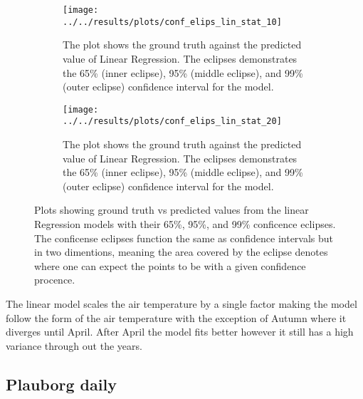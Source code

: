 
\begin{figure}
	\begin{subfigure}{0.45\linewidth}
		\centering
		\texttt{[image: ../../results/plots/conf\_elips\_lin\_stat\_10]}
		\caption[Confidence eclipse of Linear Regression 10cm]{The plot shows the ground truth against the predicted value of Linear Regression. The eclipses demonstrates the 65\% (inner eclipse), 95\% (middle eclipse), and 99\% (outer eclipse) confidence interval for the model.}
		\label{fig:confelipslinstat10}
	\end{subfigure}
	\hfill
	\begin{subfigure}{0.45\textwidth}
		\centering
		\texttt{[image: ../../results/plots/conf\_elips\_lin\_stat\_20]}
		\caption[Confidence eclipse of Linear regression 20cm]{The plot shows the ground truth against the predicted value of Linear Regression. The eclipses demonstrates the 65\% (inner eclipse), 95\% (middle eclipse), and 99\% (outer eclipse) confidence interval for the model.}
		\label{fig:confelipslinstat20}
	\end{subfigure}
	\caption{Plots showing ground truth vs predicted values from the linear Regression models with their 65\%, 95\%, and 99\% conficence eclipses. The conficense eclipses function the same as confidence intervals but in two dimentions, meaning the area covered by the eclipse denotes where one can expect the points to be with a given confidence procence.}
\end{figure}


The linear model scales the air temperature by a single factor making the model follow the form of the air temperature with the exception of Autumn where it diverges until April. After April the model fits better however it still has a high variance through out the years.


\subsection{Plauborg daily}

